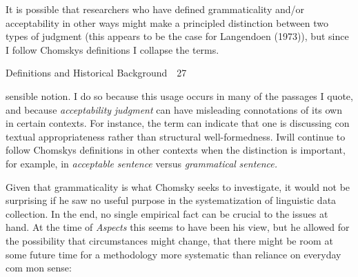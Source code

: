 \begin{listWWNumlxivleveli}
\item 
\begin{styleStandard}
It is possible that researchers who have defined grammaticality and/or acceptability in other ways might make a principled distinction between two types of judgment (this appears to be the case for Langendoen (1973)), but since I follow Chomsky{\textquotesingle}s definitions I collapse the terms.
\end{styleStandard}


\end{listWWNumlxivleveli}
\clearpage\setcounter{page}{1}\begin{styleStandard}
Definitions and Historical Background\ \ 27
\end{styleStandard}


\begin{styleStandard}
sensible notion. I do so because this usage occurs in many of the passages I quote, and because \textit{acceptability}\textit{ }\textit{judgment}\textit{ }can have misleading connotations of its own in certain contexts. For instance, the term can indicate that one is discussing con\- textual appropriateness rather than structural well-formedness. Iwill continue to follow Chomsky{\textquotesingle}s definitions in other contexts when the distinction is important, for example, in \textit{acceptable}\textit{ }\textit{sentence}\textit{ }versus \textit{grammatical}\textit{ }\textit{sentence.}
\end{styleStandard}


\begin{styleStandard}
Given that grammaticality is what Chomsky seeks to investigate, it would not be surprising if he saw no useful purpose in the systematization of linguistic data collection. In the end, no single empirical fact can be crucial to the issues at hand. At the time of \textit{Aspects}\textit{ }this seems to have been his view, but he allowed for the possibility that circumstances might change, that there might be room at some future time for a methodology more systematic than reliance on everyday com\- mon sense:
\end{styleStandard}


